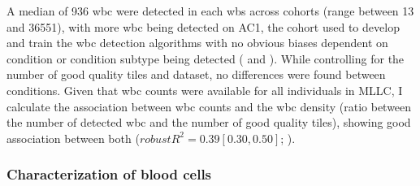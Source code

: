 \begin{figure}[!ht]
    \label{fig:wbc-segmentation-bad}
\end{figure}

A median of 936 \ac{wbc} were detected in each \ac{wbs} across cohorts (range between 13 and 36551), with more \ac{wbc} being detected on AC1, the cohort used to develop and train the \ac{wbc} detection algorithms with no obvious biases dependent on condition or condition subtype being detected ( and ). While controlling for the number of good quality tiles and dataset, no differences were found between conditions. Given that \ac{wbc} counts were available for all individuals in MLLC, I calculate the association between \ac{wbc} counts and the \ac{wbc} density (ratio between the number of detected \ac{wbc} and the number of good quality tiles), showing good association between both ($robust R^2=0.39 [0.30,0.50]$; ).

\begin{figure}[!ht]
    \label{fig:wbc-count-coarse}
\end{figure}

\begin{figure}[!ht]
    \label{fig:wbc-count-fine}
\end{figure}

\begin{figure}[!ht]
    \label{fig:wbc-count-association}
\end{figure}

\subsubsection{Characterization of blood cells}

